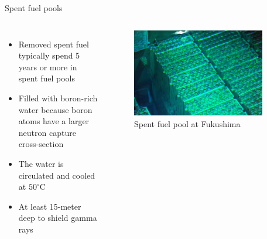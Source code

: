 \documentclass[10pt]{beamer}
\begin{document}
\begin{frame}{Spent fuel pools}
  \begin{columns}[T,onlytextwidth]
      \begin{itemize}[<+->]
      	\item Removed spent fuel typically spend 5 years or more in spent fuel pools
        \item Filled with boron-rich water because boron atoms have a larger neutron capture cross-section
        \item The water is circulated and cooled at $50^{\circ}$C
        \item At least 15-meter deep to shield gamma rays
      \end{itemize}

		\begin{figure}
		\includegraphics[width=0.9\textwidth]{fukushimafuel-rods}
		\caption*{Spent fuel pool at Fukushima}
		\end{figure}
  \end{columns}
\end{frame}
\end{document}

